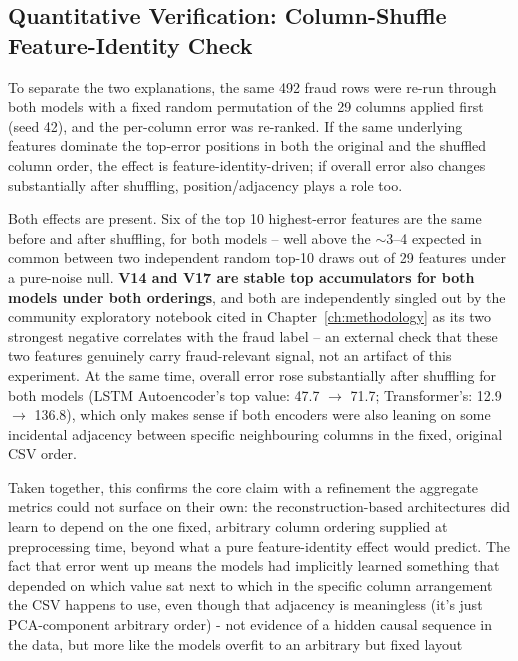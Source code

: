 \subsection{Quantitative Verification: Column-Shuffle Feature-Identity Check}

To separate the two explanations, the same 492 fraud rows were re-run through both models with a fixed random permutation of the 29 columns applied first (seed 42), and the per-column error was re-ranked. If the same underlying features dominate the top-error positions in both the original and the shuffled column order, the effect is feature-identity-driven; if overall error also changes substantially after shuffling, position/adjacency plays a role too.

\begin{center}
\end{center}

Both effects are present. Six of the top 10 highest-error features are the same before and after shuffling, for both models -- well above the $\sim$3--4 expected in common between two independent random top-10 draws out of 29 features under a pure-noise null. \textbf{V14 and V17 are stable top accumulators for both models under both orderings}, and both are independently singled out by the community exploratory notebook cited in Chapter~\ref{ch:methodology} as its two strongest negative correlates with the fraud label -- an external check that these two features genuinely carry fraud-relevant signal, not an artifact of this experiment. At the same time, overall error rose substantially after shuffling for both models (LSTM Autoencoder's top value: 47.7 $\to$ 71.7; Transformer's: 12.9 $\to$ 136.8), which only makes sense if both encoders were also leaning on some incidental adjacency between specific neighbouring columns in the fixed, original CSV order.

Taken together, this confirms the core claim with a refinement the aggregate metrics could not surface on their own: the reconstruction-based architectures did learn to depend on the one fixed, arbitrary column ordering supplied at preprocessing time, beyond what a pure feature-identity effect would predict. The fact that error went up means the models had implicitly learned something that depended on which value sat next to which in the specific column arrangement the CSV happens to use, even though that adjacency is meaningless (it's just PCA-component arbitrary order)
 - not evidence of a hidden causal sequence in the data, but more like the models overfit to an arbitrary but fixed layout

